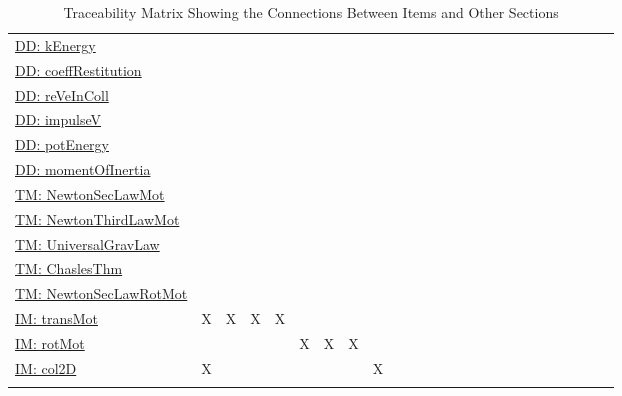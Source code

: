 \documentclass[12pt]{article}
\begin{document}
\begin{longtable}{l l l l l l l l l l l l l l l l l l l l l l l l l}
\\
\hyperref[DD:kEnergy]{DD: kEnergy} &  &  &  &  &  &  &  &  &  &  &  &  &  &  &  &  &  &  &  &  &  &  &  & 
\\
\hyperref[DD:coeffRestitution]{DD: coeffRestitution} &  &  &  &  &  &  &  &  &  &  &  &  &  &  &  &  &  &  &  &  &  &  &  & 
\\
\hyperref[DD:reVeInColl]{DD: reVeInColl} &  &  &  &  &  &  &  &  &  &  &  &  &  &  &  &  &  &  &  &  &  &  &  & 
\\
\hyperref[DD:impulseV]{DD: impulseV} &  &  &  &  &  &  &  &  &  &  &  &  &  &  &  &  &  &  &  &  &  &  &  & 
\\
\hyperref[DD:potEnergy]{DD: potEnergy} &  &  &  &  &  &  &  &  &  &  &  &  &  &  &  &  &  &  &  &  &  &  &  & 
\\
\hyperref[DD:momentOfInertia]{DD: momentOfInertia} &  &  &  &  &  &  &  &  &  &  &  &  &  &  &  &  &  &  &  &  &  &  &  & 
\\
\hyperref[TM:NewtonSecLawMot]{TM: NewtonSecLawMot} &  &  &  &  &  &  &  &  &  &  &  &  &  &  &  &  &  &  &  &  &  &  &  & 
\\
\hyperref[TM:NewtonThirdLawMot]{TM: NewtonThirdLawMot} &  &  &  &  &  &  &  &  &  &  &  &  &  &  &  &  &  &  &  &  &  &  &  & 
\\
\hyperref[TM:UniversalGravLaw]{TM: UniversalGravLaw} &  &  &  &  &  &  &  &  &  &  &  &  &  &  &  &  &  &  &  &  &  &  &  & 
\\
\hyperref[TM:ChaslesThm]{TM: ChaslesThm} &  &  &  &  &  &  &  &  &  &  &  &  &  &  &  &  &  &  &  &  &  &  &  & 
\\
\hyperref[TM:NewtonSecLawRotMot]{TM: NewtonSecLawRotMot} &  &  &  &  &  &  &  &  &  &  &  &  &  &  &  &  &  &  &  &  &  &  &  & 
\\
\hyperref[IM:transMot]{IM: transMot} & X & X & X & X &  &  &  &  &  &  &  &  &  &  &  &  &  &  &  &  &  &  &  & 
\\
\hyperref[IM:rotMot]{IM: rotMot} &  &  &  &  & X & X & X &  &  &  &  &  &  &  &  &  &  &  &  &  &  &  &  & 
\\
\hyperref[IM:col2D]{IM: col2D} & X &  &  &  &  &  &  & X &  &  &  &  &  &  &  &  &  &  &  &  &  &  &  & 
\\
\bottomrule
\caption{Traceability Matrix Showing the Connections Between Items and Other Sections}
\label{Table:TraceMatRefvsRef}
\end{longtable}
\end{document}
